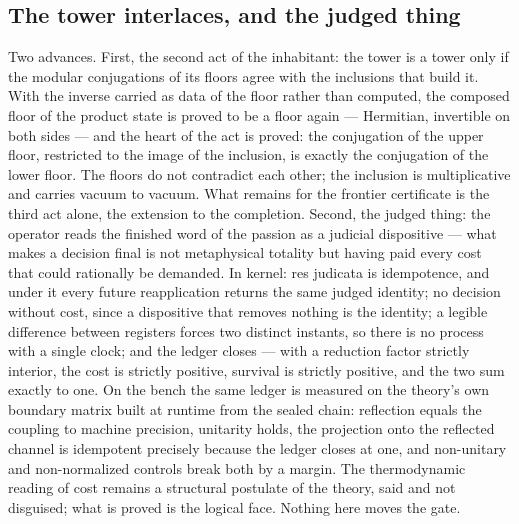 \documentclass[11pt]{article}
\theoremstyle{definition}\newtheorem{deriv}{Derivation}
\begin{document}
\subsection*{The tower interlaces, and the judged thing}Two advances. First, the second act of the inhabitant: the tower is a tower only if the modular conjugations of its floors agree with the inclusions that build it. With the inverse carried as data of the floor rather than computed, the composed floor of the product state is proved to be a floor again --- Hermitian, invertible on both sides --- and the heart of the act is proved: the conjugation of the upper floor, restricted to the image of the inclusion, is exactly the conjugation of the lower floor. The floors do not contradict each other; the inclusion is multiplicative and carries vacuum to vacuum. What remains for the frontier certificate is the third act alone, the extension to the completion. Second, the judged thing: the operator reads the finished word of the passion as a judicial dispositive --- what makes a decision final is not metaphysical totality but having paid every cost that could rationally be demanded. In kernel: res judicata is idempotence, and under it every future reapplication returns the same judged identity; no decision without cost, since a dispositive that removes nothing is the identity; a legible difference between registers forces two distinct instants, so there is no process with a single clock; and the ledger closes --- with a reduction factor strictly interior, the cost is strictly positive, survival is strictly positive, and the two sum exactly to one. On the bench the same ledger is measured on the theory's own boundary matrix built at runtime from the sealed chain: reflection equals the coupling to machine precision, unitarity holds, the projection onto the reflected channel is idempotent precisely because the ledger closes at one, and non-unitary and non-normalized controls break both by a margin. The thermodynamic reading of cost remains a structural postulate of the theory, said and not disguised; what is proved is the logical face. Nothing here moves the gate.
\end{document}
